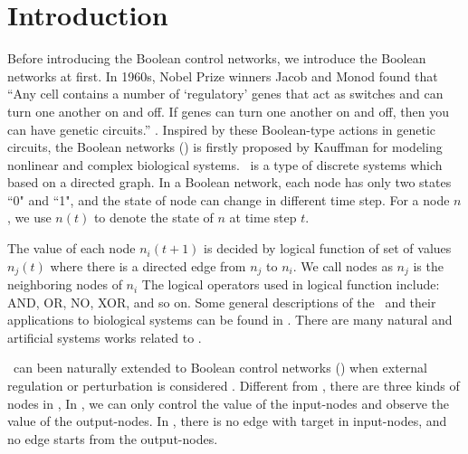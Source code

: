 \section{Introduction}
\label{sec:intro}


Before introducing the Boolean control networks, we introduce the Boolean networks at first. In 1960s, Nobel Prize winners Jacob and Monod found that ``Any cell contains a number of `regulatory' genes that act as switches and can turn one another on and off. If genes can turn one another on and off, then you can have genetic circuits.'' \cite{Jacob1961Genetic}. Inspired by these Boolean-type actions in genetic circuits, the Boolean networks (\BNs) is firstly proposed by Kauffman \cite{Kauffman1968Metabolic} for modeling nonlinear and complex biological systems. \BNs\ is a type of discrete systems which based on a directed graph. In a Boolean network, each node has only two states ``0" and ``1", and
the state of   node can change in different  time step.  For a node $n$, we use $n(t)$ to denote the state of $n$ at time step $t$.

The value of each node $n_i(t+1)$ is decided by logical function of  set of  values  $n_j(t)$  where  there is a directed edge from $n_j$ to $n_i$. We call nodes as $n_j$ is the neighboring nodes of $n_i$  
The logical operators used in  logical function include: AND, OR, NO, XOR, and so on. Some general descriptions of the \BNs\ and their applications to biological systems can be found in \cite{Kauffman1968Metabolic}.
There are many natural and artificial systems works \cite{Akutsu2000Inferring, Shmulevich2002From, Faur2006Dynamical,Green2007The,Lou2010Multi} related to \BNs.
 

         \BNs\ can been naturally extended to Boolean control networks (\BCNs) when external regulation or perturbation is considered \cite{Ideker2001A}. Different from \BNs, there are three kinds of nodes in \BCNs,  In \BCNs, we can only control the value of the input-nodes and observe the value of the output-nodes. In \BCNs, there is no edge with target in input-nodes, and no edge starts from the output-nodes.

